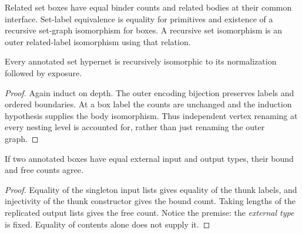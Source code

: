 \begin{definition}
Related set boxes have equal binder counts and related bodies at their common
interface. Set-label equivalence is equality for primitives and existence of a
recursive set-graph isomorphism for boxes. A recursive set isomorphism is an
outer related-label isomorphism using that relation.
\end{definition}



\begin{theorem}
Every annotated set hypernet is recursively isomorphic to its normalization
followed by exposure.
\end{theorem}
\begin{proof}
Again induct on depth. The outer encoding bijection preserves labels and ordered
boundaries. At a box label the counts are unchanged and the induction hypothesis
supplies the body isomorphism. Thus independent vertex renaming at every
nesting level is accounted for, rather than just renaming the outer graph.
\end{proof}

\begin{lemma}
If two annotated boxes have equal external input and output types, their bound
and free counts agree.
\end{lemma}
\begin{proof}
Equality of the singleton input lists gives equality of the thunk labels, and
injectivity of the thunk constructor gives the bound count. Taking lengths of
the replicated output lists gives the free count. Notice the premise: the
\emph{external type} is fixed. Equality of contents alone does not supply it.
\end{proof}


